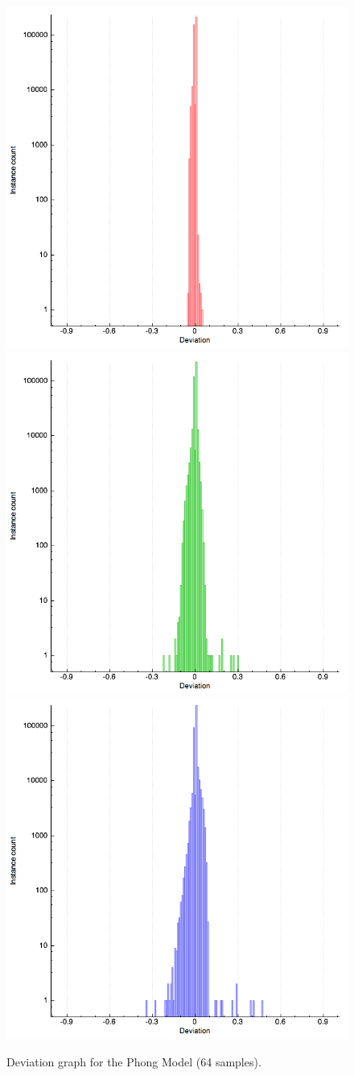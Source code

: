 \documentclass{article}
\begin{document}
\begin{figure}[p]
\centering
\includegraphics[width=.5\textwidth]{assets/phong-brdf_plot_6_red} \\
\includegraphics[width=.5\textwidth]{assets/phong-brdf_plot_6_green} \\
\includegraphics[width=.5\textwidth]{assets/phong-brdf_plot_6_blue}
\caption{Deviation graph for the Phong Model (64 samples).}
\label{fig:phong_stdev_details}
\end{figure}
\end{document}
